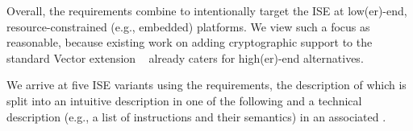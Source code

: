 \noindent
Overall, the requirements combine to intentionally target the ISE at 
 low(er)-end,
resource-constrained (e.g., embedded) platforms.  
We view such a focus as reasonable, because existing work on adding
cryptographic support to the
standard 
Vector extension ~\cite[Section 21]{RV:ISA:I:19}
already caters for
high(er)-end
alternatives.

We arrive at five ISE variants using the requirements, the description of 
which is split into
an 
intuitive 
description in one of the following \SEC[s]
and
a
technical
description
(e.g., a list of instructions and their semantics)
in an associated \APPX.

